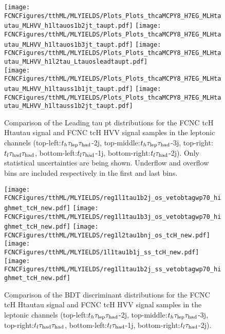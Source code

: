 \begin{figure}[htb]
  \centering
  \texttt{[image: \\FCNCFigures/tthML/MLYIELDS/Plots\_Plots\_thcaMCPY8\_H7EG\_MLHtautau\_MLHVV\_h1ltauos1b2jt\_taupt.pdf]}
  \texttt{[image: \\FCNCFigures/tthML/MLYIELDS/Plots\_Plots\_thcaMCPY8\_H7EG\_MLHtautau\_MLHVV\_h1ltauos1b3jt\_taupt.pdf]}
  \texttt{[image: \\FCNCFigures/tthML/MLYIELDS/Plots\_Plots\_thcaMCPY8\_H7EG\_MLHtautau\_MLHVV\_h1l2tau\_Ltauosleadtaupt.pdf]}
  \\
  \texttt{[image: \\FCNCFigures/tthML/MLYIELDS/Plots\_Plots\_thcaMCPY8\_H7EG\_MLHtautau\_MLHVV\_h1ltauss1b1jt\_taupt.pdf]}
  \texttt{[image: \\FCNCFigures/tthML/MLYIELDS/Plots\_Plots\_thcaMCPY8\_H7EG\_MLHtautau\_MLHVV\_h1ltauss1b2jt\_taupt.pdf]}
\\
\caption{ Comparison of the Leading tau pt distributions for the FCNC tcH Htautau signal and FCNC tcH HVV signal samples in the leptonic channels
  (top-left:$t_h\tau_\text{lep}{}\tau_\text{had}$-2j, top-middle:$t_h\tau_\text{lep}{}\tau_\text{had}$-3j, top-right:$t_l\tau_\text{had}{}\tau_\text{had}$, bottom-left:$t_l\tau_\text{had}$-1j, bottom-right:$t_l\tau_\text{had}$-2j). Only statistical uncertainties are being shown. Underflow and overflow bins are included respectively in the first and last bins.}
\label{fig:check_tcH_HWW}
\end{figure}


\begin{figure}[htb]
  \centering
  \texttt{[image: \\FCNCFigures/tthML/MLYIELDS/reg1l1tau1b2j\_os\_vetobtagwp70\_highmet\_tcH\_new.pdf]}
  \texttt{[image: \\FCNCFigures/tthML/MLYIELDS/reg1l1tau1b3j\_os\_vetobtagwp70\_highmet\_tcH\_new.pdf]}
  \texttt{[image: \\FCNCFigures/tthML/MLYIELDS/reg1l2tau1bnj\_os\_tcH\_new.pdf]}
  \\
  \texttt{[image: \\FCNCFigures/tthML/MLYIELDS/1l1tau1b1j\_ss\_tcH\_new.pdf]}
  \texttt{[image: \\FCNCFigures/tthML/MLYIELDS/reg1l1tau1b2j\_ss\_vetobtagwp70\_highmet\_tcH\_new.pdf]}
\\
\caption{ Comparison of the BDT discriminant distributions for the FCNC tcH Htautau signal and FCNC tcH HVV signal samples in the leptonic channels
  (top-left:$t_h\tau_\text{lep}{}\tau_\text{had}$-2j, top-middle:$t_h\tau_\text{lep}{}\tau_\text{had}$-3j, top-right:$t_l\tau_\text{had}{}\tau_\text{had}$, bottom-left:$t_l\tau_\text{had}$-1j, bottom-right:$t_l\tau_\text{had}$-2j).}
\label{fig:BDT_tcH_HWW}
\end{figure}

